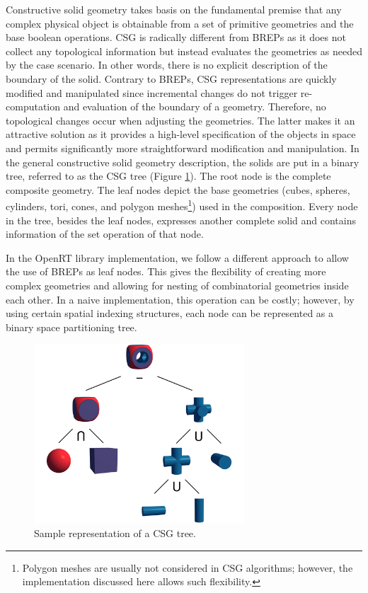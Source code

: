 \documentclass[a4paper,11pt,oneside]{article}
\begin{document}
Constructive solid geometry takes basis on the fundamental premise that any complex physical object is obtainable from a set of primitive geometries and the base boolean operations. CSG is radically different from BREPs as it does not collect any topological information but instead evaluates the geometries as needed by the case scenario. In other words, there is no explicit description of the boundary of the solid. Contrary to BREPs,  CSG representations are quickly modified and manipulated since incremental changes do not trigger re-computation and evaluation of the boundary of a geometry. Therefore, no topological changes occur when adjusting the geometries. The latter makes it an attractive solution as it provides a high-level specification of the objects in space and permits significantly more straightforward modification and manipulation. In the general constructive solid geometry description, the solids are put in a binary tree, referred to as the CSG tree (Figure \ref{sec3.1:sample-csg-tree}). The root node is the complete composite geometry. The leaf nodes depict the base geometries (cubes, spheres, cylinders, tori, cones, and polygon meshes\footnote{Polygon meshes are usually not considered in CSG algorithms; however, the implementation discussed here allows such flexibility.}) used in the composition. Every node in the tree, besides the leaf nodes, expresses another complete solid and contains information of the set operation of that node.
    
In the OpenRT library implementation, we follow a different approach to allow the use of BREPs as leaf nodes. This gives the flexibility of creating more complex geometries and allowing for nesting of combinatorial geometries inside each other. In a naive implementation, this operation can be costly; however, by using certain spatial indexing structures, each node can be represented as a binary space partitioning tree.
  
\begin{figure}[ht]
	\begin{center}
		\includegraphics[width=0.7\textwidth]{section1/sample-csg-tree.png}
	\end{center}
	\caption{Sample representation of a CSG tree.}
	\label{sec3.1:sample-csg-tree}
\end{figure}
  
\end{document}

